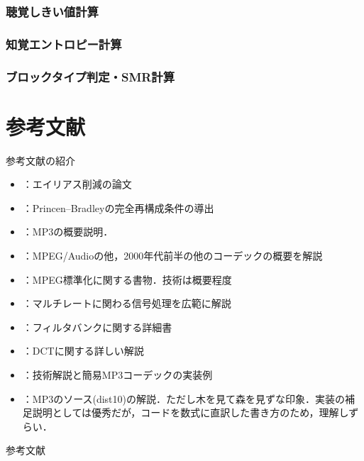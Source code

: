 \documentclass[14pt,xcolor=dvipsnames,table,dvipdfmx]{beamer}
\begin{document}
\begin{frame}[c]
    \frametitle{聴覚しきい値計算}
\end{frame}

\begin{frame}[c]
    \frametitle{知覚エントロピー計算}
\end{frame}

\begin{frame}[c]
    \frametitle{ブロックタイプ判定・SMR計算}
\end{frame}

\appendix

\section{参考文献}

\begin{frame}{参考文献の紹介}
    \scriptsize
    \begin{itemize}
        \item \cite{edler1992aliasing,liu1997design}：エイリアス削減の論文
        \item \cite{princen1986analysis}：Princen--Bradleyの完全再構成条件の導出
        \item \cite{raissi2002theory}：MP3の概要説明．
        \item \cite{fujiwara2001}：MPEG/Audioの他，2000年代前半の他のコーデックの概要を解説
        \item \cite{yasuda1994}：MPEG標準化に関する書物．技術は概要程度
        \item \cite{kiya1995}：マルチレートに関わる信号処理を広範に解説
        \item \cite{vaidyanathan2002}：フィルタバンクに関する詳細書
        \item \cite{kiya1997}：DCTに関する詳しい解説
        \item \cite{kosugi200108,kosugi200109,kosugi200111,kosugi200201,kosugi200202}：技術解説と簡易MP3コーデックの実装例
        \item \cite{urata1999}：MP3のソース(dist10)の解説．ただし木を見て森を見ずな印象．実装の補足説明としては優秀だが，コードを数式に直訳した書き方のため，理解しずらい．
    \end{itemize}
\end{frame}

\begin{frame}[allowframebreaks]{参考文献}
    \printbibliography[heading=none]
\end{frame}
\end{document}
